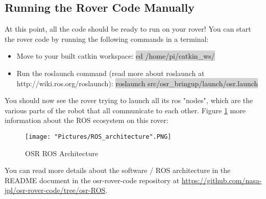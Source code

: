 \documentclass[12pt]{article}
\begin{document}
\subsection{Running the Rover Code Manually}
At this point, all the code should be ready to run on your rover!  You can start the rover code by running the following commands in a terminal:
\begin{itemize}
	\item[] Move to your built catkin workspace: \colorbox{lightgray}{cd /home/pi/catkin\_ws/}
	\item[] Run the roslaunch command (read more about roslaunch at http://wiki.ros.org/roslaunch): \colorbox{lightgray}{roslaunch src/osr\_bringup/launch/osr.launch}
\end{itemize}

\noindent You should now see the rover trying to launch all its ros "nodes", which are the various parts of the robot that all communicate to each other.  Figure \ref{ros architecture} more information about the ROS ecosystem on this rover:
\begin{figure}[H]
	\centering
   \texttt{[image: "Pictures/ROS\_architecture".PNG]}
	\caption{OSR ROS Architecture}
   \label{ros architecture}
\end{figure}

You can read more details about the software / ROS architecture in the README document in the osr-rover-code repository at \href{https://github.com/nasa-jpl/osr-rover-code/tree/osr-ROS}{https://github.com/nasa-jpl/osr-rover-code/tree/osr-ROS}.
\end{document}
